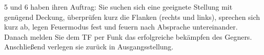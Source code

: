 5 und 6 haben ihren Auftrag: Sie suchen sich eine geeignete Stellung mit genügend Deckung, überprüfen kurz die Flanken (rechts und links), sprechen sich kurz ab, legen Feuermodus fest und feuern nach Absprache untereinander. Danach melden Sie dem TF per Funk das erfolgreiche bekämpfen des Gegners. Anschließend verlegen sie zurück in Ausgangsstellung. 
